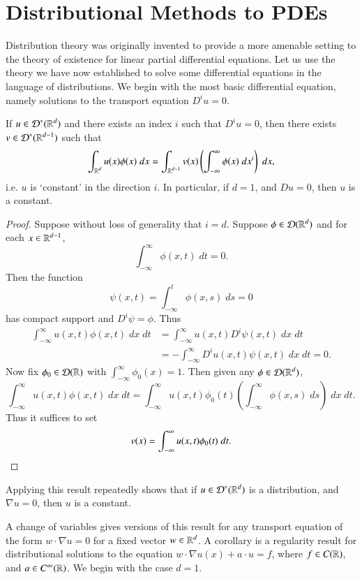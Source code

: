 \chapter{Distributional Methods to PDEs}

Distribution theory was originally invented to provide a more amenable setting to the theory of existence for linear partial differential equations. Let us use the theory we have now established to solve some differential equations in the language of distributions. We begin with the most basic differential equation, namely solutions to the transport equation $D^i u = 0$.

\begin{theorem}
  If $u \in \operatorname{\mathcal{D}}^*(\operatorname{\mathbb{R}}^d)$ and there exists an index $i$ such that $D^i u = 0$, then there exists $v \in \operatorname{\mathcal{D}}^*(\operatorname{\mathbb{R}}^{d-1})$ such that
  \[ \int_{\operatorname{\mathbb{R}}^d} u(x) \phi(x)\; dx = \int_{\operatorname{\mathbb{R}}^{d-1}} v(x) \left( \int_{-\infty}^\infty \phi(x)\; dx^i \right)\; dx, \]
  i.e. $u$ is `constant' in the direction $i$. In particular, if $d = 1$, and $D u = 0$, then $u$ is a constant.
\end{theorem}
\begin{proof}
  Suppose without loss of generality that $i = d$. Suppose $\phi \in \operatorname{\mathcal{D}}(\operatorname{\mathbb{R}}^d)$ and for each $x \in \operatorname{\mathbb{R}}^{d-1}$,
  \[ \int_{-\infty}^\infty \phi(x,t)\; dt = 0. \]
  Then the function
  \[ \psi(x,t) = \int_{-\infty}^t \phi(x,s)\; ds = 0 \]
  has compact support and $D^i \psi = \phi$. Thus
  \begin{align*}
    \int_{-\infty}^\infty u(x,t) \phi(x,t)\; dx\; dt &= \int_{-\infty}^\infty u(x,t) D^i \psi(x,t)\; dx\; dt\\
    &= - \int_{-\infty}^\infty D^i u(x,t) \psi(x,t)\; dx\; dt = 0.
  \end{align*}
  Now fix $\phi_0 \in \operatorname{\mathcal{D}}(\operatorname{\mathbb{R}})$ with $\int_{-\infty}^\infty \phi_0(x) = 1$. Then given any $\phi \in \operatorname{\mathcal{D}}(\operatorname{\mathbb{R}}^d)$,
  \[ \int_{-\infty}^\infty u(x,t) \phi(x,t)\; dx\; dt = \int_{-\infty}^\infty u(x,t) \phi_0(t) \left( \int_{-\infty}^\infty \phi(x,s)\; ds \right)\; dx\; dt. \]
  Thus it suffices to set
  \[ v(x) = \int_{-\infty}^\infty u(x,t) \phi_0(t)\; dt. \qedhere \]
\end{proof}

\begin{remark}
    Applying this result repeatedly shows that if $u \in \operatorname{\mathcal{D}}^*(\operatorname{\mathbb{R}}^d)$ is a distribution, and $\nabla u = 0$, then $u$ is a constant.
\end{remark}

A change of variables gives versions of this result for any transport equation of the form $w \cdot \nabla u = 0$ for a fixed vector $w \in \operatorname{\mathbb{R}}^d$. A corollary is a regularity result for distributional solutions to the equation $w \cdot \nabla u(x) + a \cdot u = f$, where $f \in C(\operatorname{\mathbb{R}})$, and $a \in C^\infty(\operatorname{\mathbb{R}})$. We begin with the case $d = 1$.

